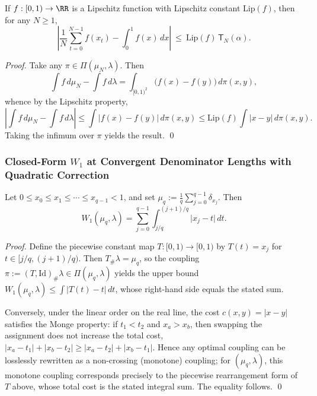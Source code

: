 \begin{theorem}\label{thm:kronecker-w1-lipschitz-readout}
If \(f:[0,1)\to\RR\) is a Lipschitz function with Lipschitz constant \(\mathrm{Lip}(f)\), then for any \(N\ge 1\),
\[
\left|\frac1N\sum_{t=0}^{N-1}f(x_t)-\int_0^1 f(x)\,dx\right|
\ \le\
\mathrm{Lip}(f)\,\mathsf{T}_N(\alpha).
\]
\end{theorem}
\begin{proof}
Take any \(\pi\in\Pi(\mu_N,\lambda)\). Then
\[
\int f\,d\mu_N-\int f\,d\lambda=\int_{[0,1)^2}\bigl(f(x)-f(y)\bigr)\,d\pi(x,y),
\]
whence by the Lipschitz property,
\[
\left|\int f\,d\mu_N-\int f\,d\lambda\right|
\le
\int |f(x)-f(y)|\,d\pi(x,y)
\le
\mathrm{Lip}(f)\int |x-y|\,d\pi(x,y).
\]
Taking the infimum over \(\pi\) yields the result. \qed
\end{proof}

\subsubsection{Closed-Form \texorpdfstring{$W_1$}{W1} at Convergent Denominator Lengths with Quadratic Correction}\label{subsec:kronecker-w1-denominator}

\begin{lemma}\label{lem:w1-quantile-formula-empirical-uniform}
Let \(0\le x_0\le x_1\le\cdots\le x_{q-1}<1\), and set
\(
\mu_q:=\frac1q\sum_{j=0}^{q-1}\delta_{x_j}
\).
Then
\[
W_1(\mu_q,\lambda)=\sum_{j=0}^{q-1}\int_{j/q}^{(j+1)/q}\bigl|x_j-t\bigr|\,dt.
\]
\end{lemma}
\begin{proof}
Define the piecewise constant map \(T:[0,1)\to[0,1)\) by \(T(t)=x_j\) for \(t\in[j/q,(j+1)/q)\). Then \(T_\#\lambda=\mu_q\), so the coupling \(\pi:=(T,\mathrm{Id})_\#\lambda\in\Pi(\mu_q,\lambda)\) yields the upper bound
\(
W_1(\mu_q,\lambda)\le \int|T(t)-t|\,dt
\),
whose right-hand side equals the stated sum.
\par
Conversely, under the linear order on the real line, the cost \(c(x,y)=|x-y|\) satisfies the Monge property: if \(t_1<t_2\) and \(x_a>x_b\), then swapping the assignment does not increase the total cost,
\(
|x_a-t_1|+|x_b-t_2|\ge |x_a-t_2|+|x_b-t_1|
\).
Hence any optimal coupling can be losslessly rewritten as a non-crossing (monotone) coupling; for \((\mu_q,\lambda)\), this monotone coupling corresponds precisely to the piecewise rearrangement form of~\(T\) above, whose total cost is the stated integral sum.
The equality follows. \qed
\end{proof}

